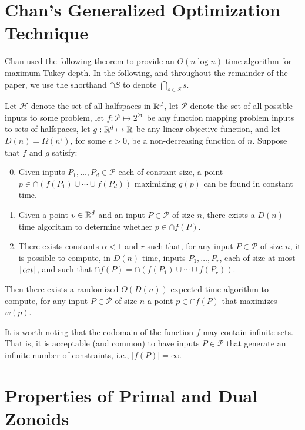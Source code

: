 \documentclass[lotsofwhite]{patmorin}
\begin{document}
\section{Chan's Generalized Optimization Technique}

Chan \cite{c04} used the following theorem to provide an $O(n\log
n)$ time algorithm for maximum Tukey depth.  In the following, and
throughout the remainder of the paper, we use the shorthand $\cap S$
to denote $\bigcap_{s\in S}s$.

\begin{thm}[Chan 2004]
Let $\mathcal{H}$ denote the set of all halfspaces in $\mathbb{R}^d$,
let $\mathcal{P}$ denote the set of all possible inputs to some problem, 
let $f:\mathcal{P}\mapsto 2^{\mathcal{H}}$ be any function mapping 
problem inputs to sets of halfspaces,
let $g:\mathbb{R}^d\mapsto \mathbb{R}$ be
any linear objective function, 
and let $D(n)=\Omega(n^{\epsilon})$, for some $\epsilon>0$, be a non-decreasing function of
$n$.  Suppose that $f$ and $g$ satisfy:
\begin{enumerate}
\setcounter{enumi}{-1}
\item Given inputs $P_1,\ldots,P_d\in\mathcal{P}$ each of constant
size, a point $p\in\cap (f(P_1)\cup\cdots\cup f(P_d))$ maximizing
$g(p)$ can be found in constant time.

\item Given a point $p\in\mathbb{R}^d$ and an input $P\in\mathcal{P}$
of size $n$, there exists a $D(n)$ time algorithm to determine whether
$p\in\cap f(P)$.

\item There exists constants $\alpha < 1$ and $r$ such that, for any
input $P\in\mathcal{P}$ of size $n$, it is possible to compute, in
$D(n)$ time, inputs $P_1,\ldots,P_r$, each of size at most
$\left\lceil \alpha n \right\rceil$, and such that $\cap f(P) =
\cap(f(P_1)\cup\cdots\cup f(P_r))$.

\end{enumerate}
Then there exists a randomized $O(D(n))$ expected time algorithm to
compute, for any input $P\in\mathcal{P}$ of size $n$ a point
$p\in\cap f(P)$ that maximizes $w(p)$.
\end{thm}

It is worth noting that the codomain of the function $f$ may contain
infinite sets.  That is, it is acceptable (and common) to have inputs
$P\in\mathcal{P}$ that generate an infinite number of constraints,
i.e., $|f(P)|=\infty$.


\section{Properties of Primal and Dual Zonoids}
\end{document}
